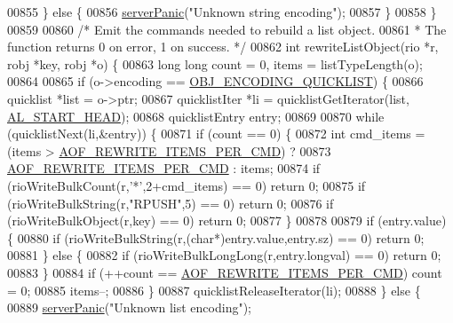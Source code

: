 \begin{DoxyCode}
{{{{{{{{{{{{{{{00855     \} \textcolor{keywordflow}{else} \{
00856         \hyperlink{server_8h_a11cc378e7778a830b41240578de3b204}{serverPanic}(\textcolor{stringliteral}{"Unknown string encoding"});
00857     \}
00858 \}
00859 
00860 \textcolor{comment}{/* Emit the commands needed to rebuild a list object.}
00861 \textcolor{comment}{ * The function returns 0 on error, 1 on success. */}
00862 \textcolor{keywordtype}{int} rewriteListObject(rio *r, robj *key, robj *o) \{
00863     \textcolor{keywordtype}{long} \textcolor{keywordtype}{long} count = 0, items = listTypeLength(o);
00864 
00865     \textcolor{keywordflow}{if} (o->encoding == \hyperlink{server_8h_aec792aeed6d4bf83966672e6a23043b8}{OBJ\_ENCODING\_QUICKLIST}) \{
00866         quicklist *list = o->ptr;
00867         quicklistIter *li = quicklistGetIterator(list, \hyperlink{adlist_8h_a353f032fdd7e66abe9f194fa7c89560b}{AL\_START\_HEAD});
00868         quicklistEntry entry;
00869 
00870         \textcolor{keywordflow}{while} (quicklistNext(li,&entry)) \{
00871             \textcolor{keywordflow}{if} (count == 0) \{
00872                 \textcolor{keywordtype}{int} cmd\_items = (items > \hyperlink{server_8h_a437bda3214c8acb2835f49eb68919507}{AOF\_REWRITE\_ITEMS\_PER\_CMD}) ?
00873                     \hyperlink{server_8h_a437bda3214c8acb2835f49eb68919507}{AOF\_REWRITE\_ITEMS\_PER\_CMD} : items;
00874                 \textcolor{keywordflow}{if} (rioWriteBulkCount(r,\textcolor{stringliteral}{'*'},2+cmd\_items) == 0) \textcolor{keywordflow}{return} 0;
00875                 \textcolor{keywordflow}{if} (rioWriteBulkString(r,\textcolor{stringliteral}{"RPUSH"},5) == 0) \textcolor{keywordflow}{return} 0;
00876                 \textcolor{keywordflow}{if} (rioWriteBulkObject(r,key) == 0) \textcolor{keywordflow}{return} 0;
00877             \}
00878 
00879             \textcolor{keywordflow}{if} (entry.value) \{
00880                 \textcolor{keywordflow}{if} (rioWriteBulkString(r,(\textcolor{keywordtype}{char}*)entry.value,entry.sz) == 0) \textcolor{keywordflow}{return} 0;
00881             \} \textcolor{keywordflow}{else} \{
00882                 \textcolor{keywordflow}{if} (rioWriteBulkLongLong(r,entry.longval) == 0) \textcolor{keywordflow}{return} 0;
00883             \}
00884             \textcolor{keywordflow}{if} (++count == \hyperlink{server_8h_a437bda3214c8acb2835f49eb68919507}{AOF\_REWRITE\_ITEMS\_PER\_CMD}) count = 0;
00885             items--;
00886         \}
00887         quicklistReleaseIterator(li);
00888     \} \textcolor{keywordflow}{else} \{
00889         \hyperlink{server_8h_a11cc378e7778a830b41240578de3b204}{serverPanic}(\textcolor{stringliteral}{"Unknown list encoding"});
}}}}}}}}}}}}}}}
\end{DoxyCode}
